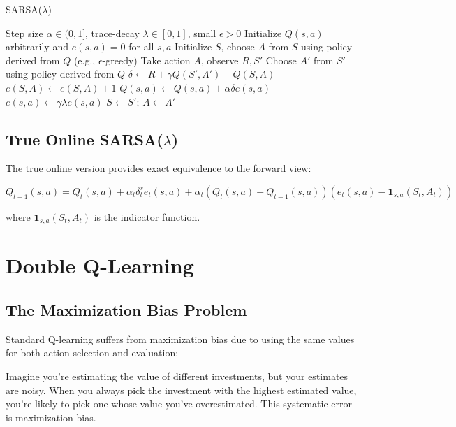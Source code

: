 \begin{algorithm}
\caption{SARSA($\lambda$)}
\begin{algorithmic}
\REQUIRE Step size $\alpha \in (0,1]$, trace-decay $\lambda \in [0,1]$, small $\epsilon > 0$
\STATE Initialize $Q(s,a)$ arbitrarily and $e(s,a) = 0$ for all $s, a$
\REPEAT
    \STATE Initialize $S$, choose $A$ from $S$ using policy derived from $Q$ (e.g., $\epsilon$-greedy)
    \REPEAT
        \STATE Take action $A$, observe $R, S'$
        \STATE Choose $A'$ from $S'$ using policy derived from $Q$
        \STATE $\delta \leftarrow R + \gamma Q(S', A') - Q(S, A)$
        \STATE $e(S, A) \leftarrow e(S, A) + 1$
            \STATE $Q(s, a) \leftarrow Q(s, a) + \alpha \delta e(s, a)$
            \STATE $e(s, a) \leftarrow \gamma \lambda e(s, a)$
        \ENDFOR
        \STATE $S \leftarrow S'$; $A \leftarrow A'$
\end{algorithmic}
\end{algorithm}

\subsection{True Online SARSA($\lambda$)}

The true online version provides exact equivalence to the forward view:

\begin{equation}
Q_{t+1}(s,a) = Q_t(s,a) + \alpha_t \delta_t^s e_t(s,a) + \alpha_t (Q_t(s,a) - Q_{t-1}(s,a))(e_t(s,a) - \mathbf{1}_{s,a}(S_t, A_t))
\end{equation}

where $\mathbf{1}_{s,a}(S_t, A_t)$ is the indicator function.

\section{Double Q-Learning}

\subsection{The Maximization Bias Problem}

Standard Q-learning suffers from maximization bias due to using the same values for both action selection and evaluation:

\begin{intuitionbox}
Imagine you're estimating the value of different investments, but your estimates are noisy. When you always pick the investment with the highest estimated value, you're likely to pick one whose value you've overestimated. This systematic error is maximization bias.
\end{intuitionbox}

